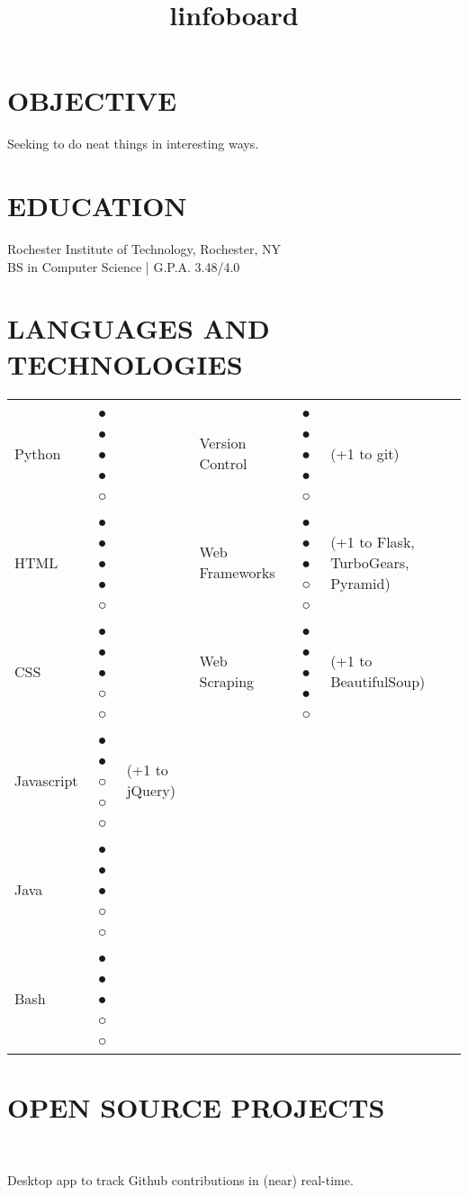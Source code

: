 \documentclass[line]{res}
\begin{document}

\address{131 Countess Drive\\West Henrietta, NY 14586\\585-210-8920}

\begin{resume}

\section{OBJECTIVE}
    Seeking to do neat things in interesting ways.

\section{EDUCATION}
    Rochester Institute of Technology, Rochester, NY \\
    BS in Computer Science | G.P.A. 3.48/4.0

\section{LANGUAGES AND TECHNOLOGIES}
    \begin{tabular}{l c l l c l}
        Python & ● ● ● ● ○ && Version Control & ● ● ● ● ○ & (+1 to git)\\
        HTML & ● ● ● ● ○ && Web Frameworks & ● ● ● ○ ○ & (+1 to Flask, TurboGears, Pyramid)\\
        CSS & ● ● ● ○ ○ && Web Scraping & ● ● ● ● ○ & (+1 to BeautifulSoup)\\
        Javascript & ● ● ○ ○ ○ & (+1 to jQuery)\\
        Java & ● ● ● ○ ○\\
        Bash & ● ● ● ○ ○\\

    \end{tabular}

\section{OPEN SOURCE PROJECTS}
    \begin{format}
        \title{l}\\
        \body
    \end{format}

    \title{infoboard}
    \begin{position}
        Desktop app to track Github contributions in (near) real-time.
    \end{position}


\end{resume}
\end{document}
